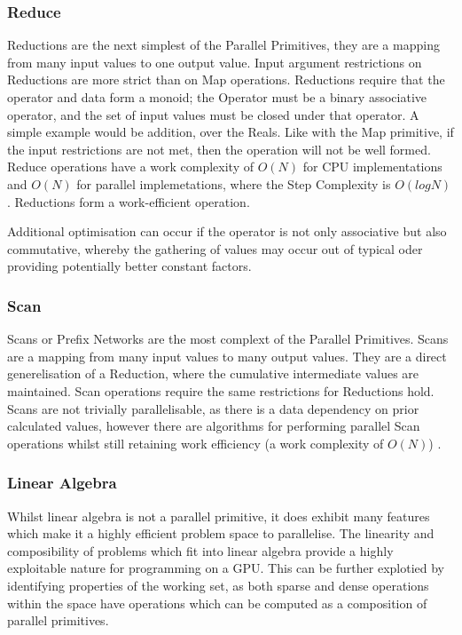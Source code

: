 \subsubsection{Reduce}

Reductions are the next simplest of the Parallel Primitives, they are a mapping from many input
values to one output value. Input argument restrictions on Reductions are more strict than on Map
operations. Reductions require that the operator and data form a monoid; the Operator must be a
binary associative operator, and the set of input values must be closed under that operator. A
simple example would be addition, over the Reals. Like with the Map primitive, if the input
restrictions are not met, then the operation will not be well formed. Reduce operations have a work
complexity of $ O(N) $ for CPU implementations and $ O(N) $ for parallel implemetations, where the
Step Complexity is $ O(log N) $. Reductions form a work-efficient operation.

Additional optimisation can occur if the operator is not only associative but also commutative,
whereby the gathering of values may occur out of typical oder providing potentially better constant
factors.


\subsubsection{Scan}

Scans or Prefix Networks are the most complext of the Parallel Primitives. Scans are a mapping from
many input values to many output values. They are a direct generelisation of a Reduction, where the
cumulative intermediate values are maintained. Scan operations require the same restrictions for
Reductions hold. Scans are not trivially parallelisable, as there is a data dependency on
prior calculated values, however there are algorithms for performing parallel Scan operations whilst
still retaining work efficiency (a work complexity of $ O(N) $) \cite{ScanOp}.

\subsubsection{Linear Algebra}
Whilst linear algebra is not a parallel primitive, it does exhibit many features which make it a
highly efficient problem space to parallelise. The linearity and composibility of problems which fit
into linear algebra provide a highly exploitable nature for programming on a GPU. This can be
further explotied by identifying properties of the working set, as both sparse and dense operations
within the space have operations which can be computed as a composition of parallel
primitives\cite{gallivan1990parallel}.

